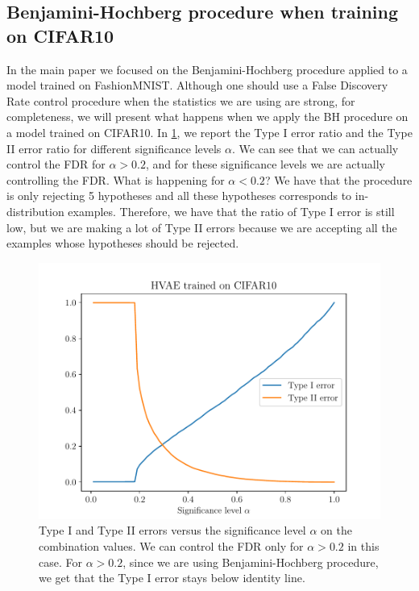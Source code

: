 {\subsection{Benjamini-Hochberg procedure when training on CIFAR10}
\label{appendix_modelagnostic:BH_cifar}
In the main paper we focused on the Benjamini-Hochberg procedure applied to a model trained on FashionMNIST. Although one should use a False Discovery Rate control procedure when the statistics we are using are strong, for completeness, we will present what happens when we apply the BH procedure on a model trained on CIFAR10. In \cref{fig_modelagnostic:type1_cifar}, we report the Type I error ratio and the Type II error ratio for different significance levels $\alpha$. We can see that we can actually control the FDR for $\alpha > 0.2$, and for these significance levels we are actually controlling the FDR. What is happening for $\alpha < 0.2$? We have that the procedure is only rejecting 5 hypotheses and all these hypotheses corresponds to in-distribution examples. Therefore, we have that the ratio of Type I error is still low, but we are making a lot of Type II errors because we are accepting all the examples whose hypotheses should be rejected.

\begin{figure}[tb]
    \centering
    \includegraphics[scale=0.5]{graphics/paper_modelagnostic/cifar_hvae_type1_correct_font.pdf}
    \caption[Type I and Type II errors versus the significance level $\alpha$ on the combination values.]{Type I and Type II errors versus the significance level $\alpha$ on the combination values. We can control the FDR only for $\alpha > 0.2$ in this case. For $\alpha >0.2$, since we are using Benjamini-Hochberg procedure, we get that the Type I error stays below identity line.}
    \label{fig_modelagnostic:type1_cifar}
\end{figure}     

}
